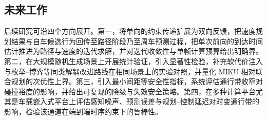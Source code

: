 \documentclass[a4paper,11pt]{ctexart}
\theoremstyle{definition}
\begin{document}
\subsection{未来工作}

后续研究可沿四个方向展开。第一，将单向的约束传递扩展为双向反馈，把速度规划结果与自车候选行为回传至路径阶段乃至周车预测过程，把单次前向的到达时间估计推进为路径与速度的迭代求解，并对迭代收敛性与单帧计算预算给出明确界。第二，在大规模随机生成场景上开展统计验证，引入显著性检验，补充软代价注入与枚举--博弈等同类解耦改进路线在相同场景上的实验对照，并量化 MIKU 相对联合规划的次优性上界。第三，引入最小间距等安全性指标，系统评估通行带收窄对碰撞裕度的影响，并给出可复现的降级与失效安全策略。第四，在多种计算平台尤其是车载嵌入式平台上评估感知噪声、预测误差与规划--控制延迟对时变通行带的影响，检验该通道在端到端时序约束下的鲁棒性。


\printbibliography[heading=bibintoc,title={参考文献}]
\end{document}
